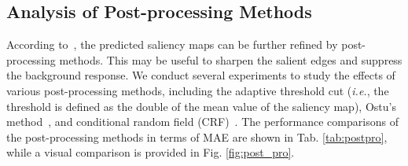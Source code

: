 \documentclass[journal]{IEEEtran}
\newcommand{\tabref}[1]{Tab. \ref{#1}}
\newcommand{\figref}[1]{Fig. \ref{#1}}
\def\ie{\emph{i.e.}}
\begin{document}
\subsection{Analysis of Post-processing\label{post} Methods}\label{sec:post_process}
According to~\cite{yang2016top,wang2019pyramid,zeng2019joint}, the predicted saliency maps can be further refined by post-processing methods.
This may be useful to sharpen the salient edges and suppress the background response.
We conduct several experiments to study the effects of various post-processing methods, including the adaptive threshold cut (\ie, the threshold is defined as the double of the mean value of the saliency map), Ostu's method~\cite{otsu1979threshold}, and conditional random field (CRF)~\cite{KrahenbuhlK11crf}.
The performance comparisons of the post-processing methods in terms of MAE are shown in \tabref{tab:postpro}, while a visual comparison is provided in \figref{fig:post_pro}.\par
\end{document}
